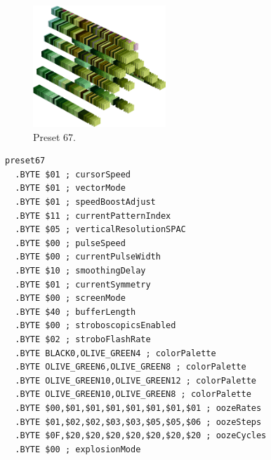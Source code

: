 \begin{minipage}[b]{0.48\linewidth}
\begin{figure}[H]                                                          
  \centering                                                             
  \begin{adjustbox}{width=5cm,center}                                   
  \includegraphics[width=5cm]{src/colorspace_presets/preset67-45.png}%
  \end{adjustbox}                                                        
\caption*{Preset 67.}                                           
\end{figure}                                                               
\end{minipage}
\hspace{0.1cm}
\begin{minipage}[b]{0.48\linewidth}                                       
\begin{lstlisting}[basicstyle=\ttfamily\tiny]
preset67
  .BYTE $01 ; cursorSpeed
  .BYTE $01 ; vectorMode
  .BYTE $01 ; speedBoostAdjust
  .BYTE $11 ; currentPatternIndex
  .BYTE $05 ; verticalResolutionSPAC
  .BYTE $00 ; pulseSpeed
  .BYTE $00 ; currentPulseWidth
  .BYTE $10 ; smoothingDelay
  .BYTE $01 ; currentSymmetry
  .BYTE $00 ; screenMode
  .BYTE $40 ; bufferLength
  .BYTE $00 ; stroboscopicsEnabled
  .BYTE $02 ; stroboFlashRate
  .BYTE BLACK0,OLIVE_GREEN4 ; colorPalette
  .BYTE OLIVE_GREEN6,OLIVE_GREEN8 ; colorPalette
  .BYTE OLIVE_GREEN10,OLIVE_GREEN12 ; colorPalette
  .BYTE OLIVE_GREEN10,OLIVE_GREEN8 ; colorPalette
  .BYTE $00,$01,$01,$01,$01,$01,$01,$01 ; oozeRates
  .BYTE $01,$02,$02,$03,$03,$05,$05,$06 ; oozeSteps
  .BYTE $0F,$20,$20,$20,$20,$20,$20,$20 ; oozeCycles
  .BYTE $00 ; explosionMode
\end{lstlisting}
\end{minipage}

